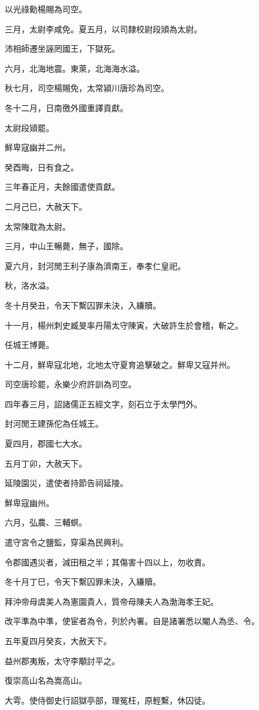 \begin{pinyinscope}
以光祿勳楊賜為司空。

三月，太尉李咸免。夏五月，以司隸校尉段熲為太尉。

沛相師遷坐誣罔國王，下獄死。

六月，北海地震。東萊，北海海水溢。

秋七月，司空楊賜免，太常潁川唐珍為司空。

冬十二月，日南徼外國重譯貢獻。

太尉段熲罷。

鮮卑寇幽并二州。

癸酉晦，日有食之。

三年春正月，夫餘國遣使貢獻。

二月己巳，大赦天下。

太常陳耽為太尉。

三月，中山王暢薨，無子，國除。

夏六月，封河閒王利子康為濟南王，奉孝仁皇祀。

秋，洛水溢。

冬十月癸丑，令天下繫囚罪未決，入縑贖。

十一月，楊州刺史臧旻率丹陽太守陳寅，大破許生於會稽，斬之。

任城王博薨。

十二月，鮮卑寇北地，北地太守夏育追擊破之。鮮卑又寇并州。

司空唐珍罷，永樂少府許訓為司空。

四年春三月，詔諸儒正五經文字，刻石立于太學門外。

封河閒王建孫佗為任城王。

夏四月，郡國七大水。

五月丁卯，大赦天下。

延陵園災，遣使者持節告祠延陵。

鮮卑寇幽州。

六月，弘農、三輔螟。

遣守宮令之鹽監，穿渠為民興利。

令郡國遇災者，減田租之半；其傷害十四以上，勿收責。

冬十月丁巳，令天下繫囚罪未決，入縑贖。

拜沖帝母虞美人為憲園貴人，質帝母陳夫人為渤海孝王妃。

改平準為中準，使宦者為令，列於內署。自是諸署悉以閹人為丞、令。

五年夏四月癸亥，大赦天下。

益州郡夷叛，太守李顒討平之。

復崇高山名為嵩高山。

大雩。使侍御史行詔獄亭部，理冤枉，原輕繫，休囚徒。


\end{pinyinscope}
